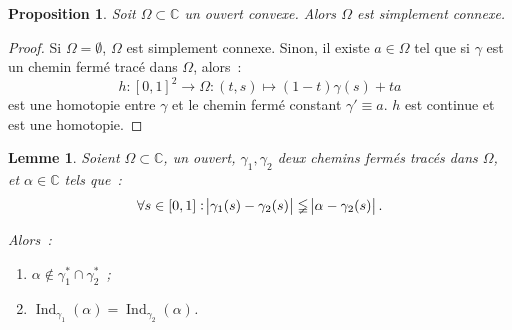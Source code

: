 \documentclass{report}
\newtheorem{prp}[thm]{Proposition}
\newtheorem{lem}[thm]{Lemme}
\theoremstyle{definition}
\theoremstyle{remark}
\numberwithin{equation}{section}
\newcommand{\C}{\mathbb C}
\DeclareMathOperator{\Ind}{Ind}
\begin{document}
			\begin{prp} Soit $\Omega \subset \C$ un ouvert convexe. Alors $\Omega$ est simplement connexe.
			\end{prp}

			\begin{proof} Si $\Omega = \emptyset$, $\Omega$ est simplement connexe. Sinon, il existe $a \in \Omega$ tel que
			si $\gamma$ est un chemin fermé tracé dans $\Omega$, alors~:
			\begin{equation}
				h : [0, 1]^2 \to \Omega : (t, s) \mapsto (1-t)\gamma(s) + ta
			\end{equation}
			est une homotopie entre $\gamma$ et le chemin fermé constant $\gamma' \equiv a$. $h$ est continue et est une homotopie.
			\end{proof}

			\begin{lem} Soient $\Omega \subset \C$, un ouvert, $\gamma_1, \gamma_2$ deux chemins fermés tracés dans $\Omega$, et $\alpha \in \C$ tels que~:
			\begin{equation}\label{eq:|gamma1-gamma2| < alpha-gamma2}
				\forall s \in [0, 1] : \abs {\gamma_1(s) - \gamma_2(s)} \lneqq \abs {\alpha - \gamma_2(s)}.
			\end{equation}

			Alors~:
			\begin{enumerate}
				\item $\alpha \not \in \gamma_1^* \cap \gamma_2^*$~;
				\item $\Ind_{\gamma_1}(\alpha) = \Ind_{\gamma_2}(\alpha)$.
			\end{enumerate}
			\end{lem}
\end{document}
